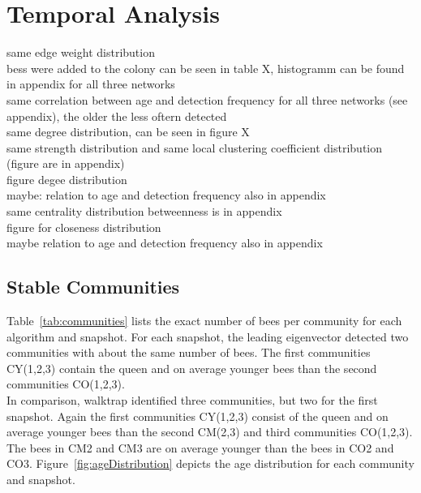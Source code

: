 \section{Temporal Analysis}

same edge weight distribution\\
bess were added to the colony can be seen in table X, histogramm can be found in appendix for all three networks\\
same correlation between age and detection frequency for all three networks (see appendix), the older the less oftern detected\\


same degree distribution, can be seen in figure X\\
same strength distribution and same local clustering coefficient distribution (figure are in appendix)\\
figure degee distribution\\
maybe: relation to age and detection frequency also in appendix\\


same centrality distribution betweenness is in appendix\\
figure for closeness distribution\\
maybe relation to age and detection frequency also in appendix\\


\subsection{Stable Communities}
Table~\ref{tab:communities} lists the exact number of bees per community for each algorithm and snapshot.
For each snapshot, the leading eigenvector detected two communities with about the same number of bees.
The first communities CY(1,2,3) contain the queen and on average younger bees than the second communities CO(1,2,3).\\
In comparison, walktrap identified three communities, but two for the first snapshot.
Again the first communities CY(1,2,3) consist of the queen and on average younger bees than the second CM(2,3) and third communities CO(1,2,3).
The bees in CM2 and CM3 are on average younger than the bees in CO2 and CO3.
Figure~\ref{fig:ageDistribution} depicts the age distribution for each community and snapshot.

